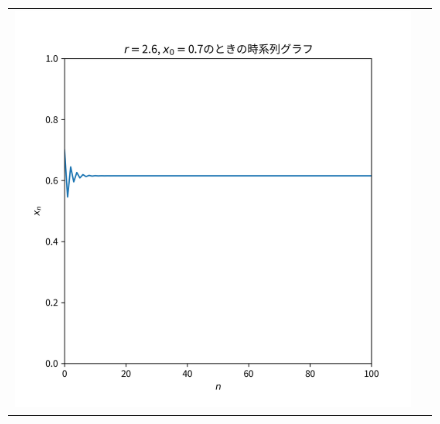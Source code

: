 \begin{figure}[htbp]
\begin{tabular}{cc}
\begin{minipage}[t]{0.45\hsize}
      \includegraphics[keepaspectratio, scale=0.3]{images/Problem1/ctest2_2_1.png}
    \end{minipage} \\


\end{tabular}
\end{figure}
